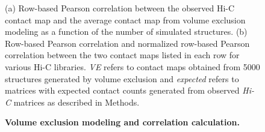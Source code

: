 \begin{figure}
  \begin{center}
  \hspace{0.03\textwidth}
  \end{center}
\caption{{\bf Volume exclusion modeling and correlation calculation.}}
{ (a) Row-based Pearson correlation between the observed Hi-C contact map
    and the average contact map from volume exclusion modeling as a function
    of the number of simulated structures.
    (b) Row-based Pearson correlation and normalized row-based Pearson
    correlation between the two contact maps listed in each row for
    various Hi-C libraries. \emph{VE} refers to
    contact maps obtained from 5000 structures generated by volume exclusion
    and \emph{expected} refers to matrices with expected contact counts
    generated from observed \emph{Hi-C} matrices as described in Methods.
    }
\label{suppfig:VEconvergence}
\end{figure}
\clearpage


